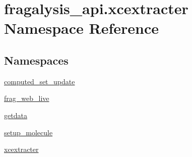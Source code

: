 \hypertarget{namespacefragalysis__api_1_1xcextracter}{}\section{fragalysis\+\_\+api.\+xcextracter Namespace Reference}
\label{namespacefragalysis__api_1_1xcextracter}
\subsection*{Namespaces}
\begin{DoxyCompactItemize}
\item 
 \hyperlink{namespacefragalysis__api_1_1xcextracter_1_1computed__set__update}{computed\+\_\+set\+\_\+update}
\item 
 \hyperlink{namespacefragalysis__api_1_1xcextracter_1_1frag__web__live}{frag\+\_\+web\+\_\+live}
\item 
 \hyperlink{namespacefragalysis__api_1_1xcextracter_1_1getdata}{getdata}
\item 
 \hyperlink{namespacefragalysis__api_1_1xcextracter_1_1setup__molecule}{setup\+\_\+molecule}
\item 
 \hyperlink{namespacefragalysis__api_1_1xcextracter_1_1xcextracter}{xcextracter}
\end{DoxyCompactItemize}

